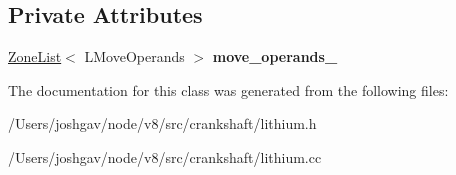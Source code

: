 \subsection*{Private Attributes}
\begin{DoxyCompactItemize}
\item 
\hyperlink{classv8_1_1internal_1_1_zone_list}{Zone\+List}$<$ L\+Move\+Operands $>$ {\bfseries move\+\_\+operands\+\_\+}\hypertarget{classv8_1_1internal_1_1_l_parallel_move_afab83696cfb53811063cb206e864addd}{}\label{classv8_1_1internal_1_1_l_parallel_move_afab83696cfb53811063cb206e864addd}

\end{DoxyCompactItemize}


The documentation for this class was generated from the following files\+:\begin{DoxyCompactItemize}
\item 
/\+Users/joshgav/node/v8/src/crankshaft/lithium.\+h\item 
/\+Users/joshgav/node/v8/src/crankshaft/lithium.\+cc\end{DoxyCompactItemize}
